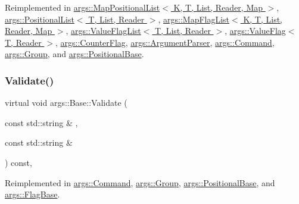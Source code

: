 Reimplemented in \hyperlink{classargs_1_1_map_positional_list_a69eefecdabf07a4fac7006acb2b144d3}{args\+::\+Map\+Positional\+List$<$ K, T, List, Reader, Map $>$}, \hyperlink{classargs_1_1_positional_list_ab322681ccb2b97aa10461aba04bd8aba}{args\+::\+Positional\+List$<$ T, List, Reader $>$}, \hyperlink{classargs_1_1_map_flag_list_a993bb59f57246e246edbd6ac3fc048eb}{args\+::\+Map\+Flag\+List$<$ K, T, List, Reader, Map $>$}, \hyperlink{classargs_1_1_value_flag_list_aa28bb85e0c850c0959b2387bdebd7b8f}{args\+::\+Value\+Flag\+List$<$ T, List, Reader $>$}, \hyperlink{classargs_1_1_value_flag_a4300f5a4d96e46810767348d3758cc78}{args\+::\+Value\+Flag$<$ T, Reader $>$}, \hyperlink{classargs_1_1_counter_flag_a408f9c2bf8f3715b89f27f23dfa2a3a5}{args\+::\+Counter\+Flag}, \hyperlink{classargs_1_1_argument_parser_a73b0dc7bc87c3a44345879f34985237f}{args\+::\+Argument\+Parser}, \hyperlink{classargs_1_1_command_aa1829501dd4f63ba3551bf85171be83e}{args\+::\+Command}, \hyperlink{classargs_1_1_group_a7ccee0f0ea0902b82029b2ab30f3f84b}{args\+::\+Group}, and \hyperlink{classargs_1_1_positional_base_a14edfb214858983cf5116c8d0fec72ea}{args\+::\+Positional\+Base}.

\mbox{\label{classargs_1_1_base_a62ea917978306062785cbfaa4dd51d2f}} 
\subsubsection{\texorpdfstring{Validate()}{Validate()}}
{\footnotesize\ttfamily virtual void args\+::\+Base\+::\+Validate (\begin{DoxyParamCaption}\item[{const std\+::string \&}]{,  }\item[{const std\+::string \&}]{ }\end{DoxyParamCaption}) const\hspace{0.3cm}{\ttfamily [inline]}, {\ttfamily [virtual]}}



Reimplemented in \hyperlink{classargs_1_1_command_ad39b397a91af426f0ecbda9d29d7bbe0}{args\+::\+Command}, \hyperlink{classargs_1_1_group_a9f74bb3d58e5bfe331a6af8a9981ebda}{args\+::\+Group}, \hyperlink{classargs_1_1_positional_base_ae328a7b091e6a409df34309a2fb44a71}{args\+::\+Positional\+Base}, and \hyperlink{classargs_1_1_flag_base_afd5a2cdea7f46caacc874c7c67ff6444}{args\+::\+Flag\+Base}.



